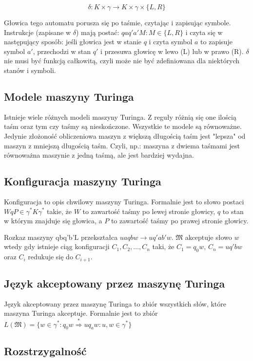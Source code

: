 \documentclass{../notatki}
\begin{document}
$$
\delta: K \times \gamma \rightarrow K \times \gamma \times \{L, R\}
$$

Głowica tego automatu porusza się po taśmie, czytając i zapisując symbole.
Instrukcje (zapisane w $\delta$) mają postać: $qaq'a'M : M \in \{L,
R\}$ i czyta się w następujący
sposób: jeśli głowica jest w stanie $q$ i czyta symbol $a$ to zapisuje symbol
$a'$, przechodzi w stan $q'$ i przesuwa głowicę w lewo (L) lub w prawo (R).
$\delta$ nie musi być funkcją całkowitą, czyli może nie być zdefiniowana dla
niektórych stanów i symboli.

\subsection{Modele maszyny Turinga}

Istnieje wiele różnych modeli maszyny Turinga. Z reguły różnią się one ilością
taśm oraz tym czy taśmy są nieskończone. Wszystkie te modele są równoważne.
Jedynie złożoność obliczeniowa maszyn z większą długością taśm jest "lepsza"
od maszyn z mniejszą długością taśm. Czyli, np.: maszyna z dwiema taśmami
jest równoważna maszynie z jedną taśmą, ale jest bardziej wydajna.

\subsection{Konfiguracja maszyny Turinga}

Konfiguracja to opis chwilowy maszyny Turinga. Formalnie jest to słowo
postaci $WqP \in \gamma^*K\gamma^*$ takie, że $W$ to zawartość taśmy po lewej
stronie głowicy, $q$ to stan w którym znajduje się głowica, a $P$ to zawartość
taśmy po prawej stronie głowicy.

Rozkaz maszyny qbq'b'L przekształca $uaqbw \rightarrow uq'ab'w$. $\mathfrak{M}$
akceptuje słowo $w$ wtedy gdy istnieje ciąg konfiguracji $C_1, C_2, \dots, C_n$
taki, że $C_1 = q_0w$, $C_n = uq'bw$ oraz $C_i$ redukuje się do $C_{i+1}$.

\subsection{Język akceptowany przez maszynę Turinga}

Język akceptowany przez maszynę Turinga to zbiór wszystkich słów, które
maszyna Turinga akceptuje. Formalnie jest to zbiór $L(\mathfrak{M}) = \{w \in
\gamma^* : q_0w \stackrel{*}{\Rightarrow} uq_aw : u, w \in \gamma^*\}$

\subsection{Rozstrzygalność}
\end{document}
